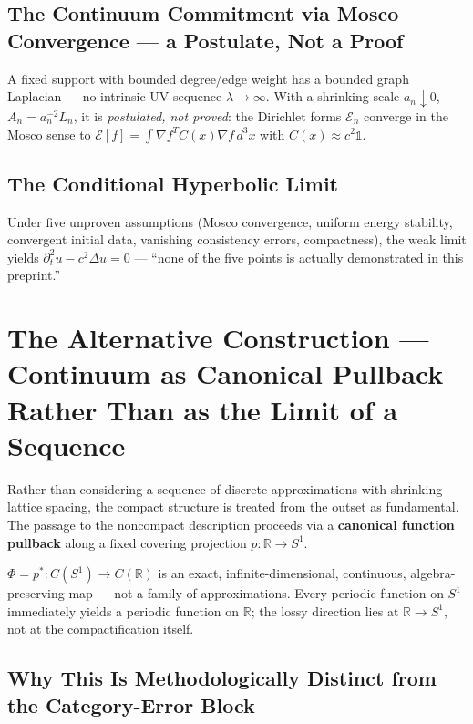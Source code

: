 \subsection{The Continuum Commitment via Mosco Convergence — a Postulate, Not a Proof}

A fixed support with bounded degree/edge weight has a bounded graph
Laplacian — no intrinsic UV sequence $\lambda\to\infty$. With a shrinking
scale $a_n\downarrow0$, $A_n=a_n^{-2}L_n$, it is \emph{postulated, not
proved}: the Dirichlet forms $\mathcal E_n$ converge in the Mosco sense to
$\mathcal E[f]=\int\nabla f^{T}C(x)\nabla f\,d^3x$ with
$C(x)\approx c^2\mathbb1$.

\subsection{The Conditional Hyperbolic Limit}

Under five unproven assumptions (Mosco convergence, uniform energy
stability, convergent initial data, vanishing consistency errors,
compactness), the weak limit yields $\partial_t^2u-c^2\Delta u=0$ —
``none of the five points is actually demonstrated in this preprint.''

\section{The Alternative Construction — Continuum as Canonical Pullback Rather Than as the Limit of a Sequence}

Rather than considering a sequence of discrete approximations with
shrinking lattice spacing, the compact structure is treated from the
outset as fundamental. The passage to the noncompact description proceeds
via a \textbf{canonical function pullback} along a fixed covering
projection $p:\mathbb{R}\to S^1$.

\begin{quellbox}[title={The Pullback as an Exact Map}]
$\Phi=p^{*}:C(S^1)\to C(\mathbb{R})$ is an exact, infinite-dimensional,
continuous, algebra-preserving map — not a family of approximations.
Every periodic function on $S^1$ immediately yields a periodic function
on $\mathbb{R}$; the lossy direction lies at $\mathbb{R}\to S^1$, not at
the compactification itself.
\end{quellbox}

\subsection{Why This Is Methodologically Distinct from the Category-Error Block}

